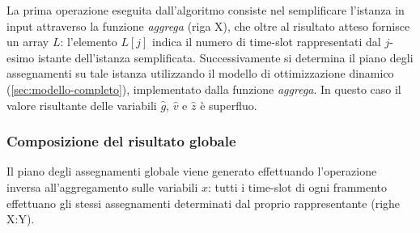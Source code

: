 La prima operazione eseguita dall'algoritmo consiste nel semplificare l'istanza in input attraverso la funzione \textit{aggrega} (riga X), che oltre al risultato atteso fornisce un array $L$: l'elemento $L[j]$ indica il numero di time-slot rappresentati dal $j$-esimo istante dell'istanza semplificata. Successivamente si determina il piano degli assegnamenti su tale istanza utilizzando il modello di ottimizzazione dinamico (\autoref{sec:modello-completo}), implementato dalla funzione \textit{aggrega}. In questo caso il valore risultante delle variabili $\hat{g}$, $\hat{v}$ e $\hat{z}$ è superfluo.

\subsubsection{Composizione del risultato globale}

Il piano degli assegnamenti globale viene generato effettuando l'operazione inversa all'aggregamento sulle variabili $x$: tutti i time-slot di ogni frammento effettuano gli stessi assegnamenti determinati dal proprio rappresentante (righe X:Y).

